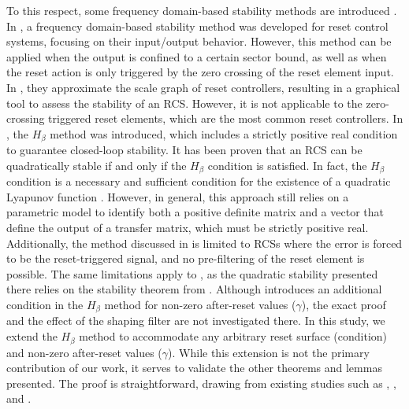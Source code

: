 To this respect, some frequency domain-based stability methods are introduced \cite{beker2004fundamental,beker1999stability,van2017frequency,van2024scaled,dastjerdi2023frequency,guo2015analysis}.
In \cite{van2017frequency}, a frequency domain-based stability method was developed for reset control systems, focusing on their input/output behavior. However, this method can be applied when the output is confined to a certain sector bound, as well as when the reset action is only triggered by the zero crossing of the reset element input.
In \cite{van2024scaled}, they approximate the scale graph \cite{huang2020tight} of reset controllers, resulting in a graphical tool to assess the stability of an RCS. However, it is not applicable to the zero-crossing triggered reset elements, which are the most common reset controllers.
In \cite{beker1999stability, beker2004fundamental}, the $H_\beta$ method was introduced, which includes a strictly positive real condition to guarantee closed-loop stability. It has been
proven that an RCS can be quadratically
stable if and only if the $H_\beta$ condition is satisfied. In fact,
the $H_\beta$ condition is a necessary and sufficient condition for the existence of a quadratic Lyapunov function \cite{beker2004fundamental,banos2010reset}. However, in general, this approach still relies on a parametric model to identify both a positive definite matrix and a vector that define the output of a transfer matrix, which must be strictly positive real.\\ Additionally, the method discussed in \cite{beker2004fundamental} is limited to RCSs where the error is forced to be the reset-triggered signal, and no pre-filtering of the reset element is possible. The same limitations apply to \cite{guo2015analysis}, as the quadratic stability presented there relies on the stability theorem from \cite{beker2004fundamental}. Although \cite[Remark 3.4]{guo2015analysis} introduces an additional condition in the $H_\beta$ method for non-zero after-reset values ($\gamma$), the exact proof and the effect of the shaping filter are not investigated there. In this study, we extend the $H_\beta$ method to accommodate any arbitrary reset surface (condition) and non-zero after-reset values ($\gamma$). While this extension is not the primary contribution of our work, it serves to validate the other theorems and lemmas presented. The proof is straightforward, drawing from existing studies such as \cite{banos2012reset}, \cite{guo2015analysis}, and \cite{beker2004fundamental}.

